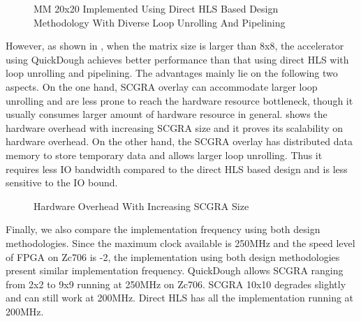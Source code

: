 \begin{figure}[htpb]
\caption{MM 20x20 Implemented Using Direct HLS Based Design Methodology With Diverse Loop Unrolling And Pipelining}
\label{fig:loop-unroll-and-pipeline}
\end{figure}

However, as shown in , when the matrix size is larger than 8x8, the accelerator using QuickDough achieves better performance than that using direct HLS with loop unrolling and pipelining. The advantages mainly lie on the following two aspects. On the one hand, SCGRA overlay can accommodate larger loop unrolling and are less prone to reach the hardware resource bottleneck, though it usually consumes larger amount of hardware resource in general.  shows the hardware overhead with increasing SCGRA size and it proves its scalability on hardware overhead. On the other hand, the SCGRA overlay has distributed data memory to store temporary data and allows larger loop unrolling. Thus it requires less IO bandwidth compared to the direct HLS based design and is less sensitive to the IO bound. 

\begin{figure}[htpb]
\caption{Hardware Overhead With Increasing SCGRA Size}
\label{fig:scgra-overhead-scalability}
\end{figure}

Finally, we also compare the implementation frequency using both design methodologies. Since the maximum clock available is 250MHz and the speed level of FPGA on Zc706 is -2, the implementation using both design methodologies present similar implementation frequency. QuickDough allows SCGRA ranging from 2x2 to 9x9 running at 250MHz on Zc706. SCGRA 10x10 degrades slightly and can still work at 200MHz. Direct HLS has all the implementation running at 200MHz. 
